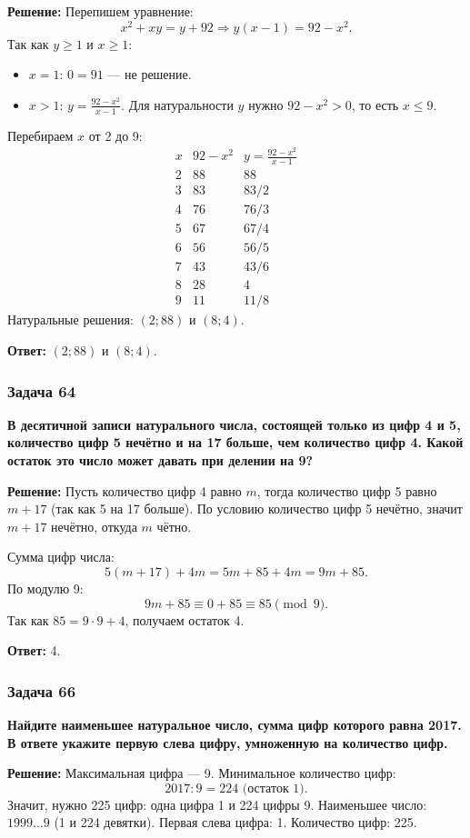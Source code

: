 \documentclass[12pt, a4paper]{article}
\begin{document}
\textbf{Решение:}
Перепишем уравнение:
\[
x^2 + xy = y + 92 \Rightarrow y(x-1) = 92 - x^2.
\]
Так как $y \ge 1$ и $x \ge 1$:
\begin{itemize}
    \item $x = 1$: $0 = 91$ — не решение.
    \item $x > 1$: $y = \frac{92 - x^2}{x-1}$. Для натуральности $y$ нужно $92 - x^2 > 0$, то есть $x \le 9$.
\end{itemize}
Перебираем $x$ от 2 до 9:
\[
\begin{array}{c|c|c}
x & 92 - x^2 & y = \frac{92-x^2}{x-1} \\
\hline
2 & 88 & 88 \\
3 & 83 & 83/2 \\
4 & 76 & 76/3 \\
5 & 67 & 67/4 \\
6 & 56 & 56/5 \\
7 & 43 & 43/6 \\
8 & 28 & 4 \\
9 & 11 & 11/8
\end{array}
\]
Натуральные решения: $(2; 88)$ и $(8; 4)$.

\textbf{Ответ:} $(2; 88)$ и $(8; 4)$.

\subsubsection*{Задача 64}
\textbf{В десятичной записи натурального числа, состоящей только из цифр 4 и 5, количество цифр 5 нечётно и на 17 больше, чем количество цифр 4. Какой остаток это число может давать при делении на 9?}

\textbf{Решение:}
Пусть количество цифр 4 равно $m$, тогда количество цифр 5 равно $m + 17$ (так как 5 на 17 больше). По условию количество цифр 5 нечётно, значит $m + 17$ нечётно, откуда $m$ чётно.

Сумма цифр числа:
\[
5(m+17) + 4m = 5m + 85 + 4m = 9m + 85.
\]
По модулю 9:
\[
9m + 85 \equiv 0 + 85 \equiv 85 \pmod{9}.
\]
Так как $85 = 9 \cdot 9 + 4$, получаем остаток 4.

\textbf{Ответ:} 4.

\subsubsection*{Задача 66}
\textbf{Найдите наименьшее натуральное число, сумма цифр которого равна 2017. В ответе укажите первую слева цифру, умноженную на количество цифр.}

\textbf{Решение:}
Максимальная цифра — 9. Минимальное количество цифр:
\[
2017 : 9 = 224 \text{ (остаток } 1).
\]
Значит, нужно 225 цифр: одна цифра 1 и 224 цифры 9. Наименьшее число: $1999\ldots9$ (1 и 224 девятки). Первая слева цифра: 1. Количество цифр: 225.
\end{document}
